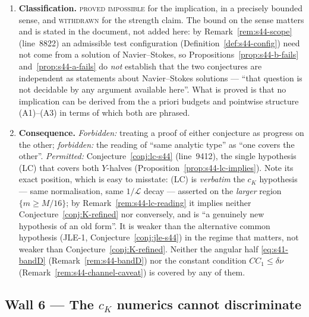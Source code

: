 \documentclass[11pt]{article}
\theoremstyle{definition}
\theoremstyle{remark}
\begin{document}
\begin{enumerate}[label=(\alph*),leftmargin=2.2em]
\begin{enumerate}[label=\textup{(\roman*)},leftmargin=2.6em]
        \textbf{withdrawn}. Corrected, $\Xi[\mathbf{1}_E]=c_K|Q(r^*)|/|E|\geq
        c_K$: the volume-normalised statistic is \emph{stronger}, not weaker.
    \end{enumerate}
  \item \textbf{Classification.} \textsc{proved impossible} for the
    implication, in a precisely bounded sense, and \textsc{withdrawn} for the
    strength claim. The bound on the sense matters and is stated in the
    document, not added here: by Remark~\ref{rem:s44-scope} (line~8822) an
    admissible test configuration (Definition~\ref{def:s44-config}) need not
    come from a solution of Navier--Stokes, so
    Propositions~\ref{prop:s44-b-fails} and~\ref{prop:s44-a-fails} do
    \emph{not} establish that the two conjectures are independent as
    statements about Navier--Stokes solutions --- ``that question is not
    decidable by any argument available here''. What is proved is that no
    implication can be derived from the a priori budgets and pointwise
    structure (A1)--(A3) in terms of which both are phrased.
  \item \textbf{Consequence.} \emph{Forbidden:} treating a proof of either
    conjecture as progress on the other; \emph{forbidden:} the reading of
    ``same analytic type'' as ``one covers the other''.
    \emph{Permitted:} Conjecture~\ref{conj:lc-s44} (line~9412), the single
    hypothesis (LC) that covers both $Y$-halves
    (Proposition~\ref{prop:s44-lc-implies}). Note its exact position, which
    is easy to misstate: (LC) is \emph{verbatim} the $c_K$ hypothesis ---
    same normalisation, same $1/\mathcal{L}$ decay --- asserted on the
    \emph{larger} region $\{m\geq M/16\}$; by
    Remark~\ref{rem:s44-lc-reading} it implies neither
    Conjecture~\ref{conj:K-refined} nor conversely, and is ``a genuinely new
    hypothesis of an old form''. It is weaker than the alternative common
    hypothesis (JLE-1, Conjecture~\ref{conj:jle-s44}) in the regime that
    matters, not weaker than Conjecture~\ref{conj:K-refined}. Neither the
    angular half \eqref{eq:s41-bandD} (Remark~\ref{rem:s44-bandD}) nor the
    constant condition $CC_1\leq\delta\nu$
    (Remark~\ref{rem:s44-channel-caveat}) is covered by any of them.
\end{enumerate}

\subsection{Wall 6 --- The \texorpdfstring{$c_K$}{c\_K} numerics cannot
  discriminate}
\label{subsec:wall6-numerics}
\end{document}
